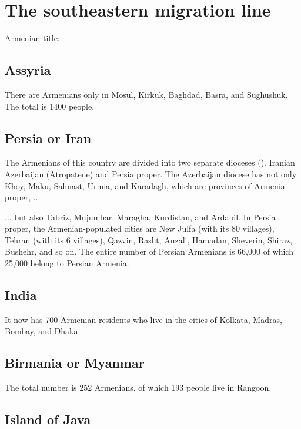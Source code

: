 \section{The southeastern migration line}

Armenian title: 

\subsection{Assyria}

There are Armenians only in Mosul, Kirkuk, Baghdad, Basra, and Sughushuk. The total is 1400 people.

\subsection{Persia or Iran}


The Armenians of this country are divided into two separate dioceses (). Iranian Azerbaijan (Atropatene) and Persia proper. The Azerbaijan diocese has not only Khoy, Maku, Salmast, Urmia, and Karadagh, which are provinces of Armenia proper, ... 

\begin{adjarianpage}\label{page:28}\end{adjarianpage}%

... but also Tabriz, Mujumbar, Maragha, Kurdistan, and Ardabil. In Persia proper, the Armenian-populated cities are New Julfa (with its 80 villages), Tehran (with its 6 villages), Qazvin, Rasht, Anzali, Hamadan, Sheverin, Shiraz, Bushehr, and so on. The entire number of Persian Armenians is 66,000 of which 25,000 belong to Persian Armenia. 

\subsection{India}

It now has 700 Armenian residents who live in the cities of Kolkata, Madras, Bombay, and Dhaka. 

\subsection{Birmania or Myanmar}

The total number is 252 Armenians, of which 193 people live in Rangoon.

\subsection{Island of Java}

